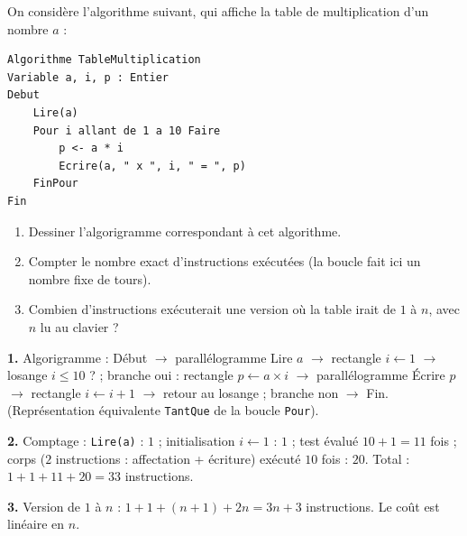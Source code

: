 \documentclass[11pt]{article}
\begin{document}
\begin{exercice}
On considère l'algorithme suivant, qui affiche la table de multiplication d'un nombre $a$ :

\begin{lstlisting}
Algorithme TableMultiplication
Variable a, i, p : Entier
Debut
    Lire(a)
    Pour i allant de 1 a 10 Faire
        p <- a * i
        Ecrire(a, " x ", i, " = ", p)
    FinPour
Fin
\end{lstlisting}

\begin{enumerate}
\item Dessiner l'algorigramme correspondant à cet algorithme.
\item Compter le nombre exact d'instructions exécutées (la boucle fait ici un nombre fixe de tours).
\item Combien d'instructions exécuterait une version où la table irait de $1$ à $n$, avec $n$ lu au clavier ?
\end{enumerate}
\end{exercice}

\begin{corrige}
\textbf{1.} Algorigramme : Début $\rightarrow$ parallélogramme \og Lire $a$ \fg{} $\rightarrow$ rectangle \og $i \leftarrow 1$ \fg{} $\rightarrow$ losange \og $i \le 10$ ? \fg{} ; branche \og oui \fg{} : rectangle \og $p \leftarrow a \times i$ \fg{} $\rightarrow$ parallélogramme \og Écrire $p$ \fg{} $\rightarrow$ rectangle \og $i \leftarrow i + 1$ \fg{} $\rightarrow$ retour au losange ; branche \og non \fg{} $\rightarrow$ Fin. (Représentation équivalente \texttt{TantQue} de la boucle \texttt{Pour}).

\textbf{2.} Comptage : \texttt{Lire(a)} : $1$ ; initialisation $i \leftarrow 1$ : $1$ ; test évalué $10 + 1 = 11$ fois ; corps ($2$ instructions : affectation + écriture) exécuté $10$ fois : $20$. Total : $1 + 1 + 11 + 20 = 33$ instructions.

\textbf{3.} Version de $1$ à $n$ : $1 + 1 + (n+1) + 2n = 3n + 3$ instructions. Le coût est linéaire en $n$.
\end{corrige}
\end{document}
